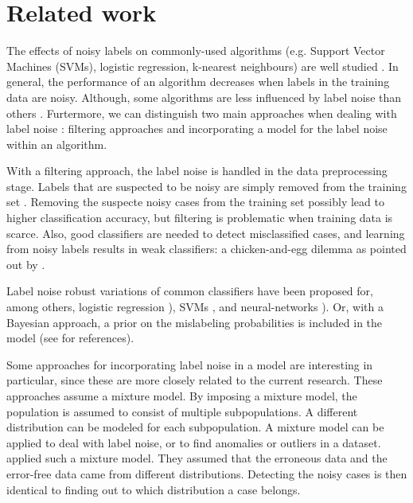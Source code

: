 \documentclass[12pt, a4paper, titlepage]{article}
\begin{document}


							\section{Related work}
							\label{section:related}

The effects of noisy labels on commonly-used algorithms (e.g. Support Vector Machines (SVMs), logistic regression, k-nearest neighbours) are well studied \citep{Pech, Nettleton}. In general, the performance of an algorithm decreases when labels in the training data are noisy. Although, some algorithms are less influenced by label noise than others \citep{Frenay}. Furtermore, we can distinguish two main approaches when dealing with label noise \citep{Frenay}: filtering approaches and  incorporating a model for the label noise within an algorithm. 

With a filtering approach, the label noise is handled in the data preprocessing stage. Labels that are suspected to be noisy are simply removed from the training set \citep{Brodley}. Removing the suspecte noisy cases from the training set possibly lead to higher classification accuracy, but filtering is problematic when training data is scarce. Also, good classifiers are needed to detect misclassified cases, and learning from noisy labels results in weak classifiers: a chicken-and-egg dilemma as pointed out by \citet{Angelova}.

Label noise robust variations of common classifiers have been proposed for, among others, logistic regression \citep{Bootkrajang, Rantalainen}), SVMs \citep{Stempfel}, and neural-networks \citep{Sigurdsson, Sukhbaatar}). Or, with a Bayesian approach, a prior on the mislabeling probabilities is included in the model (see \citet{Frenay} for references).

Some approaches for incorporating label noise in a model are interesting in particular, since these are more closely related to the current research. These approaches assume a mixture model. By imposing a mixture model, the population is assumed to consist of multiple subpopulations. A different distribution can be modeled for each subpopulation. A mixture model can be applied to deal with label noise, or to find anomalies or outliers in a dataset. \citet{DiZio, Eskin} applied such a mixture model. They assumed that the erroneous data and the error-free data came from different distributions. Detecting the noisy cases is then identical to finding out to which distribution a case belongs.
\end{document}
